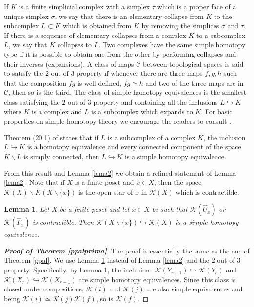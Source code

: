 \documentclass[11pt,twoside]{amsart}
\theoremstyle{plain}
\newtheorem{lema}{Lemma}[section]
\theoremstyle{remark}
\theoremstyle{definition}
\newcommand{\kp}{\mathcal{K}}
\begin{document}
If $K$ is a finite simplicial complex with a simplex $\tau$ which is a proper face of a unique simplex $\sigma$, we say that there is an elementary collapse from $K$ to the subcomplex $L\subset K$ which is obtained from $K$ by removing the simplices $\sigma$ and $\tau$. If there is a sequence of elementary collapses from a complex $K$ to a subcomplex $L$, we say that $K$ collapses to $L$. Two complexes have the same simple homotopy type if it is possible to obtain one from the other by performing collapses and their inverses (expansions).  
A class of maps $\mathcal{C}$ between topological spaces is said to satisfy the $2$-out-of-$3$ property if whenever there are three maps $f,g,h$ such that the composition $fg$ is well defined, $fg\simeq h$ and two of the three maps are in $\mathcal{C}$, then so is the third. The class of simple homotopy equivalences is the smallest class satisfying the $2$-out-of-$3$ property and containing all the inclusions $L \hookrightarrow K$ where $K$ is a complex and $L$ is a subcomplex which expands to $K$. For basic properties on simple homotopy theory we encourage the readers to consult \cite{Coh}.

Theorem (20.1) of \cite{Coh} states that if $L$ is a subcomplex of a complex $K$, the inclusion $L\hookrightarrow K$ is a homotopy equivalence and every connected component of the space $K \smallsetminus L$ is simply connected, then $L\hookrightarrow K$ is a simple homotopy equivalence. 

From this result and Lemma \ref{lema2} we obtain a refined statement of Lemma \ref{lema2}. Note that if $X$ is a finite poset and $x\in X$, then the space $\kp (X)\smallsetminus K(X\smallsetminus \{x\})$ is the open star of $x$ in $\kp (X)$ which is contractible. 

\begin{lema} \label{lema2prima}
Let $X$ be a finite poset and let $x\in X$ be such that $\kp(\hat{U}_x)$ or $\kp(\hat{F}_x)$ is contractible. Then $\kp(X\smallsetminus \{x\}) \hookrightarrow \kp(X)$ is a simple homotopy equivalence. 
\end{lema}

\begin{proof}[\textbf{Proof of Theorem \ref{ppalprima}}]
The proof is essentially the same as the one of Theorem \ref{ppal}. We use Lemma \ref{lema2prima} instead of Lemma \ref{lema2} and the $2$ out-of $3$ property. Specifically, by Lemma \ref{lema2prima}, the inclusions $\kp (Y_{r-1})\hookrightarrow \kp (Y_r)$ and $\kp (X_{r})\hookrightarrow \kp (X_{r-1})$ are simple homotopy equivalences. Since this class is closed under compositions, $\kp (i)$ and $\kp (j)$ are also simple equivalences and being $\kp (i)\simeq \kp (j) \kp (f)$, so is $\kp (f)$.
\end{proof}
\end{document}
